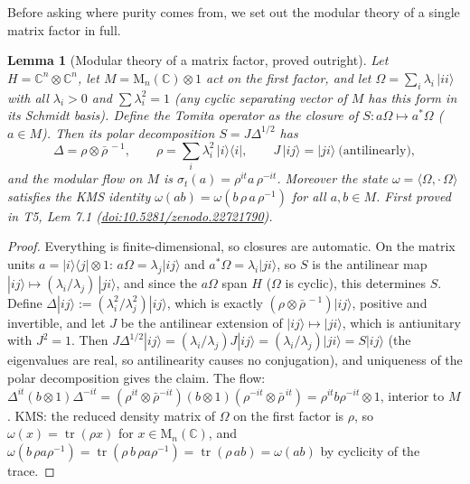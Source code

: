 \documentclass[11pt]{article}
\newtheorem{lemma}[theorem]{Lemma}
\theoremstyle{definition}
\theoremstyle{plain}
\providecommand{\C}{}\renewcommand{\C}{\mathbb{C}}
\providecommand{\Mat}{}\renewcommand{\Mat}{\mathrm{M}}
\providecommand{\tr}{}\renewcommand{\tr}{\operatorname{tr}}
\begin{document}
Before asking where purity comes from, we set out the modular theory of a single matrix factor in full.

\begin{lemma}[Modular theory of a matrix factor, proved outright]\label{c:singularity.modular-theory-matrix-factor-proved-outright}
Let $H = \C^n \otimes \C^n$, let $M = \Mat_n(\C) \otimes 1$ act on the first factor, and let $\Omega = \sum_i \lambda_i\, |ii\rangle$ with all $\lambda_i > 0$ and $\sum \lambda_i^2 = 1$ (any cyclic separating vector of $M$ has this form in its Schmidt basis). Define the Tomita operator as the closure of $S : a\Omega \mapsto a^*\Omega$ ($a \in M$). Then its polar decomposition $S = J\Delta^{1/2}$ has
\[
\Delta = \rho \otimes \bar\rho^{\,-1}, \qquad \rho = \sum_i \lambda_i^2\,|i\rangle\langle i| , \qquad J\,|ij\rangle = |ji\rangle \ \text{(antilinearly)},
\]
and the modular flow on $M$ is $\sigma_t(a) = \rho^{it} a\, \rho^{-it}$. Moreover the state $\omega = \langle\Omega, \cdot\,\Omega\rangle$ satisfies the KMS identity $\omega(ab) = \omega(b\,\rho\,a\,\rho^{-1})$ for all $a, b \in M$.
\emph{First proved in} T5, Lem 7.1 (\href{https://doi.org/10.5281/zenodo.22721790}{doi:10.5281/zenodo.22721790}).
\end{lemma}
\begin{proof}
Everything is finite-dimensional, so closures are automatic. On the matrix units $a = |i\rangle\langle j| \otimes 1$: $a\Omega = \lambda_j |ij\rangle$ and $a^*\Omega = \lambda_i |ji\rangle$, so $S$ is the antilinear map $|ij\rangle \mapsto (\lambda_i/\lambda_j)\,|ji\rangle$, and since the $a\Omega$ span $H$ ($\Omega$ is cyclic), this determines $S$. Define $\Delta |ij\rangle := (\lambda_i^2/\lambda_j^2)|ij\rangle$, which is exactly $(\rho \otimes \bar\rho^{\,-1})|ij\rangle$, positive and invertible, and let $J$ be the antilinear extension of $|ij\rangle \mapsto |ji\rangle$, which is antiunitary with $J^2 = 1$. Then $J\Delta^{1/2}|ij\rangle = (\lambda_i/\lambda_j) J|ij\rangle = (\lambda_i/\lambda_j)|ji\rangle = S|ij\rangle$ (the eigenvalues are real, so antilinearity causes no conjugation), and uniqueness of the polar decomposition gives the claim. The flow: $\Delta^{it}(b \otimes 1)\Delta^{-it} = (\rho^{it}\otimes\bar\rho^{-it})(b \otimes 1)(\rho^{-it}\otimes\bar\rho^{\,it}) = \rho^{it} b \rho^{-it} \otimes 1$, interior to $M$. KMS: the reduced density matrix of $\Omega$ on the first factor is $\rho$, so $\omega(x) = \tr(\rho x)$ for $x \in \Mat_n(\C)$, and $\omega(b\,\rho a \rho^{-1}) = \tr(\rho\, b\, \rho a \rho^{-1}) = \tr(\rho\, a b) = \omega(ab)$ by cyclicity of the trace.

\end{proof}
\end{document}
